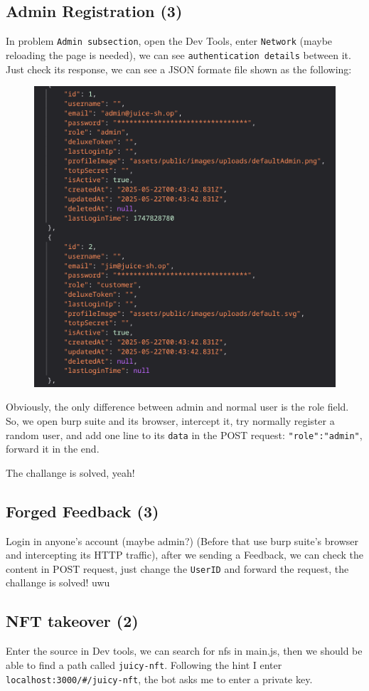 \documentclass[12pt]{article}
\begin{document}
\subsection{Admin Registration (3)}
In problem \texttt{Admin subsection}, open the Dev Tools, enter \texttt{Network} (maybe reloading the page is needed), we can see \texttt{authentication details} between it. Just check its response, we can see a JSON formate file shown as the following:
\begin{figure}[H]
    \centering
    \includegraphics[width=0.6\linewidth]{images/6.png}
\end{figure}

Obviously, the only difference between admin and normal user is the role field. So, we open burp suite and its browser, intercept it, try normally register a random user, and add one line to its \texttt{data} in the POST request: \texttt{"role":"admin"}, forward it in the end.

The challange is solved, yeah!
\subsection{Forged Feedback (3)}
Login in anyone's account (maybe admin?) (Before that use burp suite's browser and intercepting its HTTP traffic), after we sending a Feedback, we can check the content in POST request, just change the \texttt{UserID} and forward the request, the challange is solved! uwu

\subsection{NFT takeover (2)}
Enter the source in Dev tools, we can search for nfs in main.js, then we should be able to find a path called \texttt{juicy-nft}. Following the hint I enter \texttt{localhost:3000/\#/juicy-nft}, the bot asks me to enter a private key.
\end{document}
